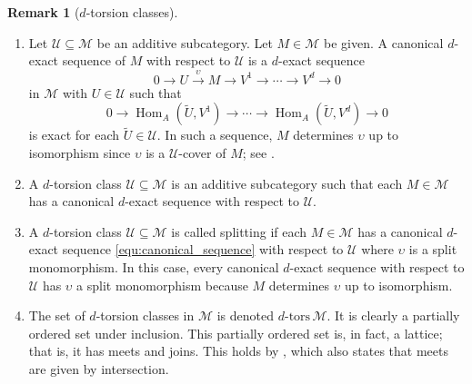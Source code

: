 \documentclass[12pt,reqno]{amsart}
\def\cM{\mathscr{M}}
\def\cU{\mathscr{U}}
\def\dtors{d\mbox{-tors}}
\def\Hom{\operatorname{Hom}}
\numberwithin{equation}{section}
\theoremstyle{definition}
\newtheorem{Remark}[Lemma]{Remark}
\theoremstyle{theorem}
\theoremstyle{definition}
\begin{document}
\begin{Remark}
[$d$-torsion classes]
\label{rmk:d-torsion_classes}
${\;}$
\begin{enumerate}
\setlength\itemsep{4pt}

  \item  Let $\cU \subseteq \cM$ be an additive subcategory.  Let $M \in \cM$ be given.  A canonical $d$-exact sequence of $M$ with respect to $\cU$ is a $d$-exact sequence 
\begin{equation}
\label{equ:canonical_sequence}
  0
  \xrightarrow{} U
  \xrightarrow{ \upsilon } M
  \xrightarrow{} V^1
  \xrightarrow{} \cdots
  \xrightarrow{} V^d
  \xrightarrow{} 0
\end{equation}
in $\cM$ with $U \in \cU$ such that
\[
  0
  \xrightarrow{} \Hom_A( \widetilde{ U },V^1 )
  \xrightarrow{} \cdots 
  \xrightarrow{} \Hom_A( \widetilde{ U },V^d )
  \xrightarrow{} 0
\]
is exact for each $\widetilde{ U } \in \cU\!$.  In such a sequence, $M$ determines $\upsilon$ up to isomorphism since $\upsilon$ is a $\cU$-cover of $M$; see \cite[lem.\ 2.7(i)]{Jorgensen_Torsion-classes-in-higher-homological-algebra}.

  \item  A $d$-torsion class $\cU \subseteq \cM$ is an additive subcategory such that each $M \in \cM$ has a canonical $d$-exact sequence with respect to $\cU\!$.
  
  \item  A $d$-torsion class $\cU \subseteq \cM$ is called splitting if each $M \in \cM$ has a canonical $d$-exact sequence \eqref{equ:canonical_sequence} with respect to $\cU$ where $\upsilon$ is a split monomorphism.  In this case, every canonical $d$-exact sequence with respect to $\cU$ has $\upsilon$ a split monomorphism because $M$ determines $\upsilon$ up to isomorphism.

  \item  The set of $d$-torsion classes in $\cM$ is denoted $\dtors\,\cM$.  It is clearly a partially ordered set under inclusion.  This partially ordered set is, in fact, a lattice; that is, it has meets and joins.  This holds by \cite[thm.\ 4.3]{August-et-al_A-characterisation-of-higher-torsion-classes}, which also states that meets are given by intersection.

\end{enumerate}
\end{Remark}
\end{document}
